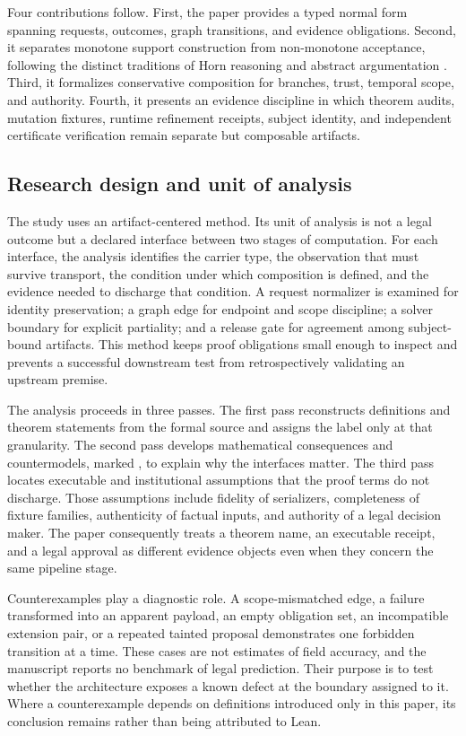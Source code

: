 Four contributions follow. First, the paper provides a typed normal form spanning requests, outcomes, graph transitions, and evidence obligations. Second, it separates monotone support construction from non-monotone acceptance, following the distinct traditions of Horn reasoning and abstract argumentation \citep{Horn1951,Tarski1955,Dung1995}. Third, it formalizes conservative composition for branches, trust, temporal scope, and authority. Fourth, it presents an evidence discipline in which theorem audits, mutation fixtures, runtime refinement receipts, subject identity, and independent certificate verification remain separate but composable artifacts.

\subsection{Research design and unit of analysis}

The study uses an artifact-centered method. Its unit of analysis is not a legal outcome but a declared interface between two stages of computation. For each interface, the analysis identifies the carrier type, the observation that must survive transport, the condition under which composition is defined, and the evidence needed to discharge that condition. A request normalizer is examined for identity preservation; a graph edge for endpoint and scope discipline; a solver boundary for explicit partiality; and a release gate for agreement among subject-bound artifacts. This method keeps proof obligations small enough to inspect and prevents a successful downstream test from retrospectively validating an upstream premise.

The analysis proceeds in three passes. The first pass reconstructs definitions and theorem statements from the formal source and assigns the \formalized{} label only at that granularity. The second pass develops mathematical consequences and countermodels, marked \derived{}, to explain why the interfaces matter. The third pass locates executable and institutional assumptions that the proof terms do not discharge. Those assumptions include fidelity of serializers, completeness of fixture families, authenticity of factual inputs, and authority of a legal decision maker. The paper consequently treats a theorem name, an executable receipt, and a legal approval as different evidence objects even when they concern the same pipeline stage.

Counterexamples play a diagnostic role. A scope-mismatched edge, a failure transformed into an apparent payload, an empty obligation set, an incompatible extension pair, or a repeated tainted proposal demonstrates one forbidden transition at a time. These cases are not estimates of field accuracy, and the manuscript reports no benchmark of legal prediction. Their purpose is to test whether the architecture exposes a known defect at the boundary assigned to it. Where a counterexample depends on definitions introduced only in this paper, its conclusion remains \derived{} rather than being attributed to Lean.

